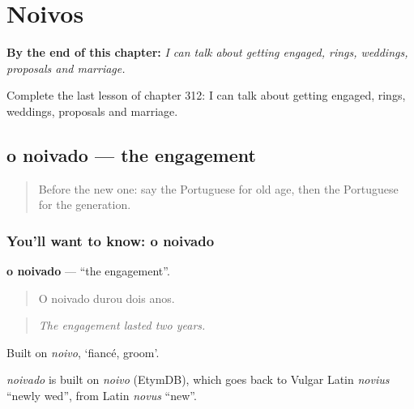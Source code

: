 
\chapter{Noivos}
\label{ch:pt-noivos}

\begin{chapteropening}
\textbf{By the end of this chapter:} \emph{I can talk about getting engaged, rings, weddings, proposals and marriage.}

Complete the last lesson of chapter 312: I can talk about getting engaged, rings, weddings, proposals and marriage.
\end{chapteropening}

\section[o noivado]{o noivado — the engagement}

\label{lesson:PT-C312-noivado}



\begin{quote}
Before the new one: say the Portuguese for old age, then the Portuguese for the generation.
\end{quote}

\subsection*{You'll want to know: o noivado}
\textbf{o noivado} — \textquotedblleft{}the engagement\textquotedblright{}.

\begin{quote}
O noivado durou dois anos.
\end{quote}

\begin{quote}
\emph{The engagement lasted two years.}
\end{quote}

Built on \emph{noivo}, ‘fiancé, groom’.

\begin{cousinweb}
\emph{noivado} is built on \emph{noivo} (EtymDB), which goes back to Vulgar Latin \emph{novius} \textquotedblleft{}newly wed\textquotedblright{}, from Latin \emph{novus} \textquotedblleft{}new\textquotedblright{}.
\end{cousinweb}

